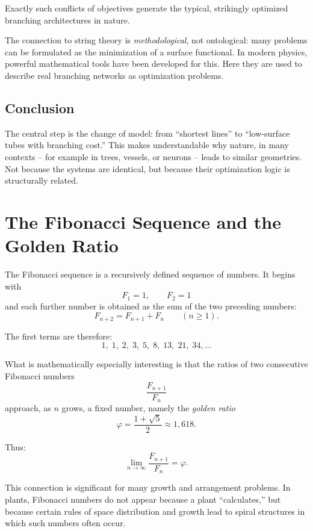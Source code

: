 Exactly such conflicts of objectives generate the typical, strikingly optimized branching architectures in nature.
\begin{DidacticBox}
	\label{box:stringtheory-surfaceoptimization}
	The connection to string theory is \emph{methodological}, not ontological:
	many problems can be formulated as the minimization of a surface functional.
	In modern physics, powerful mathematical tools have been developed for this.
	Here they are used to describe real branching networks as optimization problems.
\end{DidacticBox}

\subsection{Conclusion}

The central step is the change of model:
from ``shortest lines'' to ``low-surface tubes with branching cost.''
This makes understandable why nature, in many contexts
-- for example in trees, vessels, or neurons --
leads to similar geometries.
Not because the systems are identical, but because their optimization logic is structurally related.

\section{The Fibonacci Sequence and the \newline  Golden Ratio}
\label{app:fibonacci-goldener-schnitt}

The Fibonacci sequence is a recursively defined sequence of numbers.
It begins with
\[
F_1 = 1,\qquad F_2 = 1
\]
and each further number is obtained as the sum of the two preceding numbers:
\[
F_{n+2} = F_{n+1} + F_n \qquad (n \geq 1).
\]

The first terms are therefore:
\[
1,\;1,\;2,\;3,\;5,\;8,\;13,\;21,\;34,\dots
\]

What is mathematically especially interesting is that the ratios of two consecutive Fibonacci numbers
\[
\frac{F_{n+1}}{F_n}
\]
approach, as \(n\) grows, a fixed number, namely the \emph{golden ratio}
\[
\varphi = \frac{1+\sqrt{5}}{2} \approx 1{,}618.
\]

Thus:
\[
\lim_{n\to\infty} \frac{F_{n+1}}{F_n} = \varphi.
\]

This connection is significant for many growth and arrangement problems.
In plants, Fibonacci numbers do not appear because a plant ``calculates,''
but because certain rules of space distribution and growth lead to spiral structures
in which such numbers often occur.

